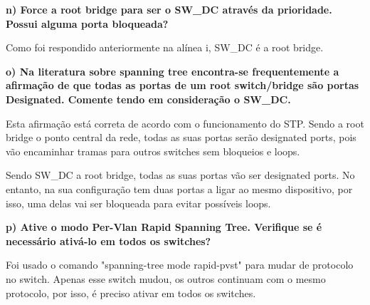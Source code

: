 \documentclass[11pt,english, openright, oneside]{book}
\begin{document}
\textbf{n) Force a root bridge para ser o SW\_DC através da prioridade. Possui alguma porta bloqueada?}
\vspace{0.2cm}

Como foi respondido anteriormente na alínea i, SW\_DC é a root bridge.
\vspace{0.8cm}


\textbf{o) Na literatura sobre spanning tree encontra-se frequentemente a afirmação de que todas as portas de um root switch/bridge são portas Designated. Comente tendo em consideração o SW\_DC.}
\vspace{0.2cm}

Esta afirmação está correta de acordo com o funcionamento do STP. Sendo a root
bridge o ponto central da rede, todas as suas portas serão designated ports,
pois vão encaminhar tramas para outros switches sem bloqueios e loops.

Sendo SW\_DC a root bridge, todas as suas portas vão ser designated ports. No
entanto, na sua configuração tem duas portas a ligar ao mesmo dispositivo, por
isso, uma delas vai ser bloqueada para evitar possíveis loops.
\vspace{0.8cm}


\textbf{p) Ative o modo Per-Vlan Rapid Spanning Tree. Verifique se é necessário ativá-lo em todos os switches? }
\vspace{0.2cm}

Foi usado o comando "spanning-tree mode rapid-pvst" para mudar de protocolo no
switch. Apenas esse switch mudou, os outros continuam com o mesmo protocolo, por
isso, é preciso ativar em todos os switches.
\end{document}
